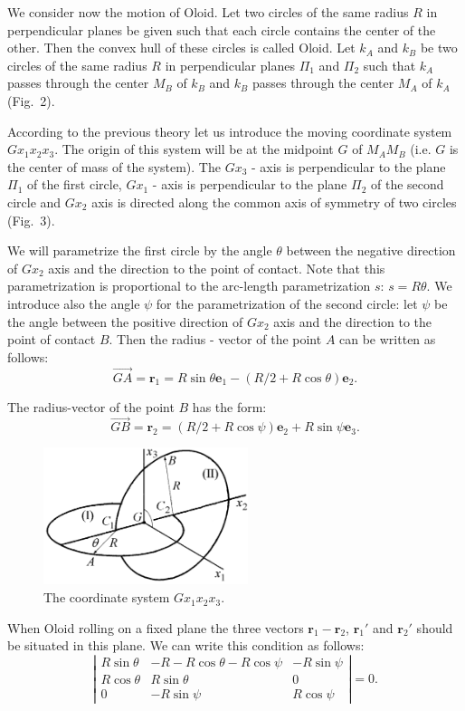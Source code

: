 \documentclass[10pt]{enoc2011}
\renewcommand{\vec}[1]{\boldsymbol{#1}}
\begin{document}
We consider now the motion of Oloid. Let two circles of the same radius $R$ in perpendicular planes be given such that each circle contains the center of the other. Then the convex hull of these circles is called Oloid. Let $k_A$ and $k_B$ be two circles of the same radius $R$ in perpendicular planes $\Pi_1$ and $\Pi_2$ such that $k_A$ passes through the center $M_B$ of $k_B$ and $k_B$ passes through the center $M_A$ of $k_A$ (Fig.~2).

According to the previous theory let us introduce the moving coordinate system $Gx_1x_2x_3$. The origin of this system will be at the midpoint $G$ of $M_AM_B$ (i.e. $G$ is the center of mass of the system). The $Gx_3$ - axis is perpendicular to the plane $\Pi_1$ of the first circle, $Gx_1$ - axis is perpendicular to the plane $\Pi_2$ of the second circle and $Gx_2$ axis is directed along the common axis of symmetry of two circles (Fig.~3).

We will parametrize the first circle by the angle $\theta$ between the negative direction of $Gx_2$ axis and the direction to the point of contact. Note that this parametrization is proportional to the arc-length parametrization $s$: $s=R\theta$. We introduce also the angle $\psi$ for the parametrization of the second circle: let $\psi$ be the angle between the positive direction of $Gx_2$ axis and the direction to the point of contact $B$. Then the radius - vector of the point $A$ can be written as follows:
$$
\overrightarrow{GA}=\vec r_1=R\sin\theta\vec e_1-\left(R/2+R\cos\theta\right)\vec e_2.
$$

The radius-vector of the point $B$ has the form:
$$
\overrightarrow{GB}=\vec r_2=\left(R/2+R\cos\psi\right)\vec e_2+R\sin\psi\vec e_3.
$$

\begin{figure}[h]
\centering\includegraphics[height=4cm]{Oloid2}
\caption{The coordinate system $Gx_1x_2x_3$.}
\end{figure}

When Oloid rolling on a fixed plane the three vectors $\vec r_1-\vec r_2$, $\vec r_1'$ and $\vec r_2'$ should be situated in this plane. We can write this condition as follows:
$$
\left|
\begin{array}{ccc}
R\sin\theta & -R-R\cos\theta-R\cos\psi & -R\sin\psi \\
R\cos\theta & R\sin\theta & 0 \\
0 & -R\sin\psi & R\cos\psi
\end{array}
\right|=0.
$$
\end{document}
